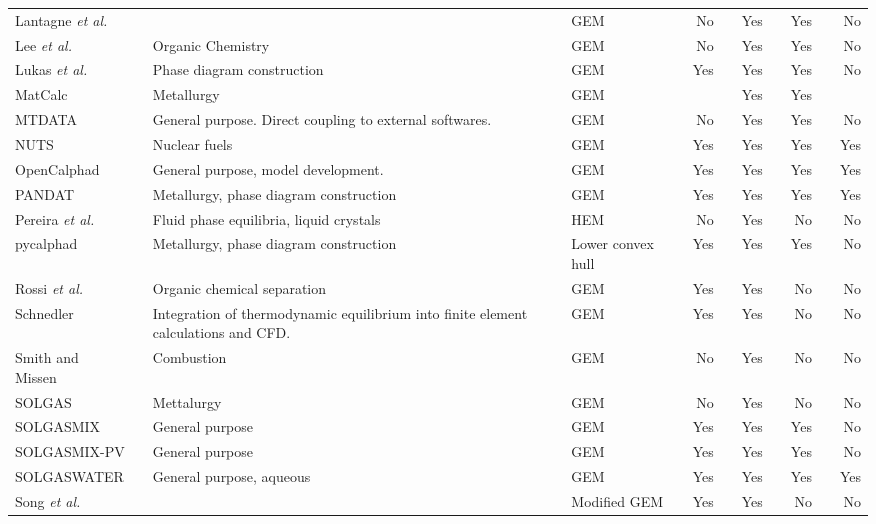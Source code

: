 \begin{landscape}
\begin{longtable}{@{}p{}cp{}clcrcrcrcr@{}}
		Lantagne \textit{et al.} \cite{LANTAGNE1988589} && {} && {GEM} && No && Yes && Yes && No\\
		Lee \textit{et al.} \cite{PENGLEE19991183} && {Organic Chemistry} && {GEM} && No && Yes && Yes && No\\
		Lukas \textit{et al.} \cite{Lukas77} && {Phase diagram construction} && {GEM} && Yes && Yes && Yes && No\\
		MatCalc && {Metallurgy} \cite{Kozeschnik:2001aa} && {GEM} &&  && Yes && Yes && \\
		MTDATA  \cite{Davies02} && {General purpose. Direct coupling to external softwares.} && {GEM} && No && Yes && Yes && No\\
		NUTS \cite{Loukusa:2014aa} && {Nuclear fuels} && {GEM} && Yes && Yes && Yes && Yes\\
		OpenCalphad \cite{Sundman:2015aa} && {General purpose, model development.} && {GEM} && Yes && Yes && Yes && Yes\\
		PANDAT \cite{Cao09} && {Metallurgy, phase diagram construction} && {GEM} && Yes && Yes && Yes && Yes\\
		Pereira \textit{et al.} \cite{PEREIRA20101} && {Fluid phase equilibria, liquid crystals} && {HEM} && No && Yes && No && No\\
		pycalphad \cite{Otis:2017aa} && {Metallurgy, phase diagram construction} && {Lower convex hull} && Yes && Yes && Yes && No\\
		Rossi \textit{et al.} \cite{ROSSI20111226} && {Organic chemical separation} && GEM && Yes && Yes && No && No\\
		Schnedler \cite{SCHNEDLER1984265} && {Integration of thermodynamic equilibrium into finite element calculations and CFD.} && GEM && Yes && Yes && No && No\\
		Smith and Missen \cite{Smith:1988aa}&& {Combustion} && GEM && No && Yes && No && No\\
		SOLGAS \cite{Eriksson71} && {Mettalurgy} && GEM && No && Yes && No && No\\
		SOLGASMIX \cite{Eriksson:1975aa} &&  {General purpose} && GEM && Yes && Yes && Yes && No\\
		SOLGASMIX-PV \cite{Besmann:1977aa} && {General purpose} && GEM && Yes && Yes && Yes && No\\
		SOLGASWATER \cite{ERIKSSON1979375} && {General purpose, aqueous} && GEM && Yes && Yes && Yes && Yes\\
		Song \textit{et al.} \cite{SONG19912513} && {} && Modified GEM && Yes && Yes && No && No\\

\end{longtable}
\end{landscape}
